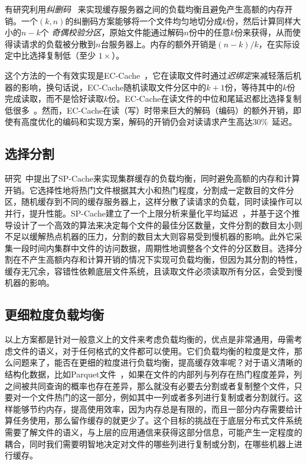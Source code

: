 \par 有研究利用\emph{纠删码}~\cite{huang2012erasure,sathiamoorthy2013xoring} 来实现缓存服务器之间的负载均衡且避免产生高额的内存开销。一个$(k,n)$的纠删码方案能够将一个文件均匀地切分成$k$份，然后计算同样大小的$n-k$个 \emph{奇偶校验分区}，原始文件能通过解码$n$份中的任意$k$份来获得，从而使得读请求的负载被分散到$n$台服务器上。内存的额外开销是$(n-k)/k$，在实际设定中比选择复制低（至少 $1\times$）。
\par 这个方法的一个有效实现是EC-Cache~\cite{rashmi2016ec}，它在读取文件时通过\emph{迟绑定}来减轻落后机器的影响，换句话说，EC-Cache随机读取文件分区中的$k+1$份，等待其中的$k$份完成读取，而不是恰好读取$k$份。EC-Cache在读文件的中位和尾延迟都比选择复制低很多~\cite{rashmi2016ec}。然而，EC-Cache在读（写）时带来巨大的解码（编码）的额外开销，即使有高度优化的编码和实现方案，解码的开销仍会对读请求产生高达$30\%$~\cite{rashmi2016ec}延迟。

\subsection{选择分割}

\par 研究~\cite{Yu:2018:SLR:3291656.3291658}中提出了SP-Cache来实现集群缓存的负载均衡，同时避免高额的内存和计算开销。它选择性地将热门文件根据其大小和热门程度，分割成一定数目的文件分区，随机缓存到不同的缓存服务器上，这样分散了读请求的负载，同时读操作可以并行，提升性能。SP-Cache建立了一个上限分析来量化平均延迟~\cite{Yu:2018:SLR:3291656.3291658}，并基于这个推导设计了一个高效的算法来决定每个文件的最佳分区数量，文件分割的数目太小则不足以缓解热点机器的压力，分割的数目太大则容易受到慢机器的影响。此外它采集一段时间内集群中文件的访问数据，周期性地调整各个文件的分区数目。选择分割在不产生高额内存和计算开销的情况下实现可负载均衡，但因为其分割的特性，缓存无冗余，容错性依赖底层文件系统，且读取文件必须读取所有分区，会受到慢机器的影响。

\subsection{更细粒度负载均衡}

\par 以上方案都是针对一般意义上的文件来考虑负载均衡的，优点是非常通用，毋需考虑文件的语义，对于任何格式的文件都可以使用。它们负载均衡的粒度是文件，那么问题来了，能否在更细的粒度进行负载均衡，提高缓存效率呢？对于语义清晰的结构化数据，比如Parquet文件~\cite{parquet}，如果在文件的内部列与列存在热门程度差异，列之间被共同查询的概率也存在差异，那么就没有必要去分割或者复制整个文件，只要对一个文件热门的这一部分，例如其中一列或者多列进行复制或者分割就行。这样能够节约内存，提高使用效率，因为内存总是有限的，而且一部分内存需要给计算任务使用，那么留作缓存的就更少了。这个目标的挑战在于底层分布式文件系统需要了解文件的语义，与上层的应用通信来获得这部分信息，可能产生一定程度的耦合，同时我们需要明智地决定对文件的哪些列进行复制或分割，在哪些机器上进行缓存。


